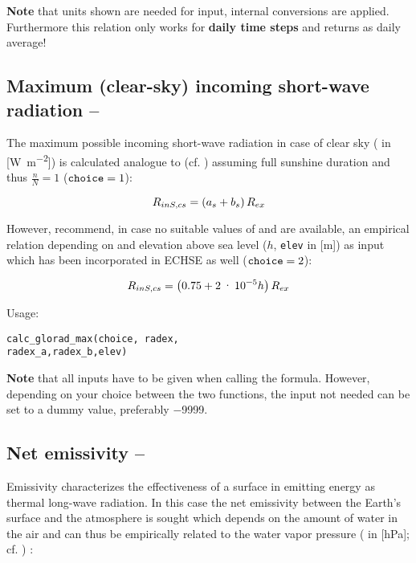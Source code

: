 \textbf{Note} that units shown are needed for input, internal conversions are applied. Furthermore this relation only works for \textbf{daily time steps} and returns \radShortwaveIn{} as daily average!


\subsection{Maximum (clear-sky) incoming short-wave radiation -- \radShortwaveInClearsky} \label{sec:meteo:radshortmax}
The maximum possible incoming short-wave radiation in case of clear sky (\radShortwaveInClearsky{} in [\si{\watt\per\metre\squared}]) is calculated analogue to \radShortwaveIn{} (cf. ) assuming full sunshine duration and thus $\frac{n}{N} = \num{1}$ ($\verb!choice! = 1$):

\begin{equation}\label{eqn:meteo:radshortmax_a}
R_{inS,cs}{} = \left( a_s + b_s \right) R_{ex}{}
\end{equation}

However, \citet{Allen2005} recommend, in case no suitable values of \angstA{} and \angstB{} are available, an empirical relation depending on \radExtraterr{} and elevation above sea level ($h$, \verb!elev! in [\si{\metre}]) as input which has been incorporated in ECHSE as well ($\verb!choice! = 2$):

\begin{equation}\label{eqn:meteo:radshortmax_b}
R_{inS,cs}{} = \left( 0.75 + \num{2e-5} h \right) R_{ex}{}
\end{equation}

\noindent
Usage:
\begin{verbatim}
calc_glorad_max(choice, radex,
radex_a,radex_b,elev)
\end{verbatim}

\textbf{Note} that all inputs have to be given when calling the formula. However, depending on your choice between the two functions, the input not needed can be set to a dummy value, preferably \num{-9999}.


\subsection{Net emissivity -- \emissivity} \label{sec:meteo:emiss}
Emissivity characterizes the effectiveness of a surface in emitting energy as thermal long-wave radiation. In this case the net emissivity between the Earth's surface and the atmosphere is sought which depends on the amount of water in the air and can thus be empirically related to the water vapor pressure (\vaporPressure{} in [\si{\hecto\pascal}]; cf. ) \citep{Maidment1993}:

